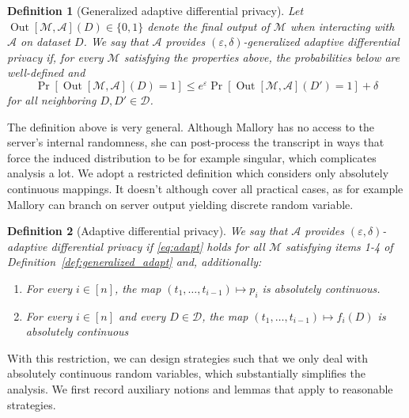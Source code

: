 \documentclass[12pt,letterpaper]{article}
\let\eps\varepsilon
\newtheorem{definition}{Definition}
\begin{document}
\begin{definition}[Generalized adaptive differential privacy]
Let $\operatorname{Out}[\mathcal{M},\mathcal{A}](D)\in\{0,1\}$ denote the final output of $\mathcal{M}$ when interacting with $\mathcal{A}$ on dataset $D$. We say that $\mathcal{A}$ provides $(\eps,\delta)$-generalized adaptive differential privacy if, for every $\mathcal{M}$ satisfying the properties above, the probabilities below are well-defined and
\begin{equation}
  \label{eq:adapt}
  \Pr[\operatorname{Out}[\mathcal{M},\mathcal{A}](D)=1] \leq e^{\eps}\Pr[\operatorname{Out}[\mathcal{M},\mathcal{A}](D')=1] + \delta
\end{equation}
for all neighboring $D,D'\in\mathcal{D}$.
\end{definition}

The definition above is very general. Although Mallory has no access to the server's internal randomness, she can post-process the transcript in ways that force the induced distribution to be for example singular, which complicates analysis a lot. We adopt a restricted definition which considers only absolutely continuous mappings. It doesn't although cover all practical cases, as for example Mallory can branch on server output yielding discrete random variable. 

\begin{definition}[Adaptive differential privacy]
We say that $\mathcal{A}$ provides $(\eps,\delta)$-adaptive differential privacy if \eqref{eq:adapt} holds for all $\mathcal{M}$ satisfying items 1-4 of Definition~\ref{def:generalized_adapt} and, additionally:
\begin{enumerate}
  \addtocounter{enumi}{4}
  \item For every $i\in[n]$, the map $(t_1,\ldots,t_{i-1})\mapsto p_i$ is absolutely continuous.
  \item For every $i\in[n]$ and every $D\in\mathcal{D}$, the map $(t_1,\ldots,t_{i-1})\mapsto f_i(D)$ is absolutely continuous
\end{enumerate}
\end{definition}

With this restriction, we can design strategies such that we only deal with absolutely continuous random variables, which substantially simplifies the analysis. We first record auxiliary notions and lemmas that apply to reasonable strategies.
\end{document}
